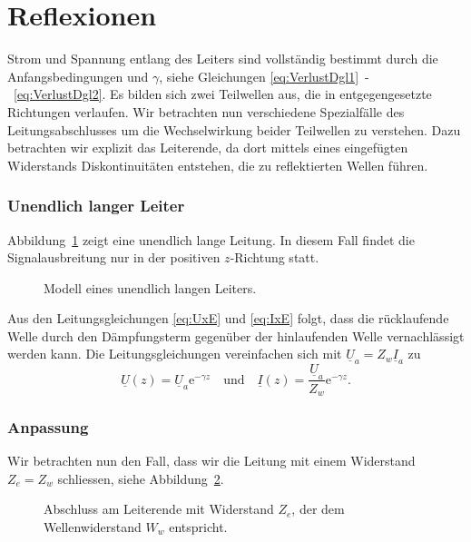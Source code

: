 \documentclass[paper=a4, parskip=half-, ngerman, fontsize=11pt]{scrreprt}
\begin{document}
\section{Reflexionen}

Strom und Spannung entlang des Leiters sind vollständig bestimmt durch die Anfangsbedingungen und $\gamma$, siehe
Gleichungen \eqref{eq:VerlustDgl1}~-~\eqref{eq:VerlustDgl2}. Es bilden sich zwei Teilwellen aus, die in
entgegengesetzte Richtungen verlaufen. Wir betrachten nun verschiedene Spezialfälle des Leitungsabschlusses um die
Wechselwirkung beider Teilwellen zu verstehen. Dazu betrachten wir explizit das Leiterende, da dort mittels eines
eingefügten Widerstands Diskontinuitäten entstehen, die zu reflektierten Wellen führen.

\subsubsection{Unendlich langer Leiter}

Abbildung~\ref{OhneAbschluss} zeigt eine unendlich lange Leitung. In diesem Fall findet die Signalausbreitung nur in
der positiven $z$-Richtung statt.
\begin{figure}[!htb]
    \begin{center}
        
        \caption{Modell eines unendlich langen Leiters.}
        \label{OhneAbschluss}
    \end{center}
\end{figure}
Aus den Leitungsgleichungen \eqref{eq:UxE} und \eqref{eq:IxE} folgt, dass die rücklaufende Welle durch den
Dämpfungsterm gegenüber der hinlaufenden Welle vernachlässigt werden kann. Die Leitungsgleichungen vereinfachen sich
mit $\underline{U}_{a} = Z_{w} \underline{I}_{a}$ zu
\[ \underline{U}(z) = \underline{U}_{a} \mathrm{e}^{- \gamma z} \quad \text{und} \quad
 \underline{I}(z) = \frac{\underline{U}_{a}}{Z_{w}} \mathrm{e}^{- \gamma z}. \]

\subsubsection{Anpassung}
Wir betrachten nun den Fall, dass wir die Leitung mit einem Widerstand $Z_{e} = Z_{w}$ schliessen, siehe
Abbildung~\ref{AbschlussMitWiderstand}.
\begin{figure}[!htb]
    \begin{center}
        
        \caption{Abschluss am Leiterende mit Widerstand $Z_{e}$, der dem Wellenwiderstand $W_{w}$ entspricht.}
        \label{AbschlussMitWiderstand}
    \end{center}
\end{figure}
\end{document}
